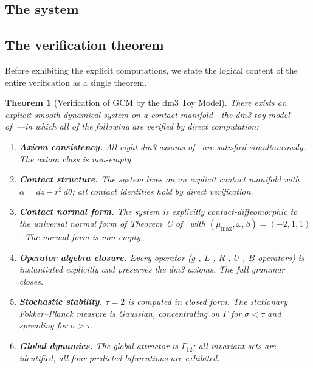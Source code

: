 \documentclass[12pt, oneside]{book}
\theoremstyle{plain}
\newtheorem{theorem}{Theorem}[section]
\theoremstyle{definition}
\theoremstyle{remark}
\newcommand{\Orb}{\Gamma}
\begin{document}
\subsection{The system}

\subsection{The verification theorem}
\label{subsec:verification-theorem}

Before exhibiting the explicit computations, we state the logical
content of the entire verification as a single theorem.

\begin{theorem}[Verification of GCM by the dm3 Toy Model]
\label{thm:verification}
There exists an explicit smooth dynamical system on a contact
manifold---the dm3 toy model of~\cite{Paper2}---in which all of
the following are verified by direct computation:
\begin{enumerate}[label=\textup{(\arabic*)}]
  \item \textbf{Axiom consistency.} All eight dm3 axioms
        of~\cite{Paper1} are satisfied simultaneously.
        The axiom class is non-empty.
  \item \textbf{Contact structure.} The system lives on an explicit
        contact manifold with $\alpha=dz-r^2\,d\theta$; all contact
        identities hold by direct verification.
  \item \textbf{Contact normal form.} The system is explicitly
        contact-diffeomorphic to the universal normal form of
        Theorem~C of~\cite{Paper1} with $(\mu_{\max},\omega,\beta)=(-2,1,1)$.
        The normal form is non-empty.
  \item \textbf{Operator algebra closure.} Every operator ($g$-,
        $L$-, $R$-, $U$-, $B$-operators) is instantiated explicitly
        and preserves the dm3 axioms. The full grammar closes.
  \item \textbf{Stochastic stability.} $\tau=2$ is computed in
        closed form. The stationary Fokker--Planck measure is
        Gaussian, concentrating on $\Orb$ for $\sigma<\tau$ and
        spreading for $\sigma>\tau$.
  \item \textbf{Global dynamics.} The global attractor is $\Orb_{12}$;
        all invariant sets are identified; all four predicted
        bifurcations are exhibited.
\end{enumerate}
\end{theorem}
\end{document}

